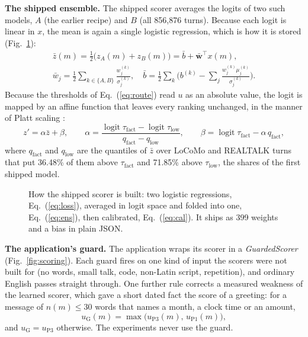 \textbf{The shipped ensemble.} The shipped scorer averages the logits of two
such models, $A$ (the earlier recipe) and $B$ (all 856{,}876 turns). Because
each logit is linear in $x$, the mean is again a single logistic regression,
which is how it is stored (Fig.~\ref{fig:training}):
\begin{equation}
\label{eq:ens}
\begin{gathered}
\bar z(m)=\tfrac12\big(z_A(m)+z_B(m)\big)=\bar b+\bar{\mathbf{w}}^{\top}x(m),\\
\bar w_j=\tfrac12\sum_{k\in\{A,B\}}\frac{w^{(k)}_j}{\sigma^{(k)}_j},\quad
\bar b=\tfrac12\sum_{k}\Big(b^{(k)}-\sum_j\frac{w^{(k)}_j\mu^{(k)}_j}{\sigma^{(k)}_j}\Big).
\end{gathered}
\end{equation}
Because the thresholds of Eq.~(\ref{eq:route}) read $u$ as an absolute value,
the logit is mapped by an affine function that leaves every ranking
unchanged, in the manner of Platt scaling \cite{platt1999probabilistic}:
\begin{equation}
\label{eq:cal}
z'=\alpha\bar z+\beta,\qquad
\alpha=\frac{\operatorname{logit}\tau_{\text{fact}}-\operatorname{logit}\tau_{\text{low}}}{q_{\text{fact}}-q_{\text{low}}},\qquad
\beta=\operatorname{logit}\tau_{\text{fact}}-\alpha\,q_{\text{fact}},
\end{equation}
where $q_{\text{fact}}$ and $q_{\text{low}}$ are the quantiles of $\bar z$
over LoCoMo and REALTALK turns that put 36.48\% of them above
$\tau_{\text{fact}}$ and 71.85\% above $\tau_{\text{low}}$, the shares of the
first shipped model.

\begin{figure}[htbp]
\centering
\resizebox{0.8\textwidth}{!}{}
\caption[How the shipped scorer is built.]{How the shipped scorer is built: two logistic regressions,
Eq.~(\ref{eq:loss}), averaged in logit space and folded into one,
Eq.~(\ref{eq:ens}), then calibrated, Eq.~(\ref{eq:cal}). It ships as 399
weights and a bias in plain JSON.}
\label{fig:training}
\end{figure}

\textbf{The application's guard.} The application wraps its scorer in a
\emph{GuardedScorer} (Fig.~\ref{fig:scoring}). Each guard fires on one kind of
input the scorers were not built for (no words, small talk, code, non-Latin
script, repetition), and ordinary English passes straight through. One further
rule corrects a measured weakness of the learned scorer, which gave a short
dated fact the score of a greeting: for a message of $n(m)\le30$ words that
names a month, a clock time or an amount,
\begin{equation}
\label{eq:floor}
u_{\mathrm{G}}(m)=\max\big(u_{\mathrm{P3}}(m),\,u_{\mathrm{P1}}(m)\big),
\end{equation}
and $u_{\mathrm{G}}=u_{\mathrm{P3}}$ otherwise. The experiments never use the
guard.

